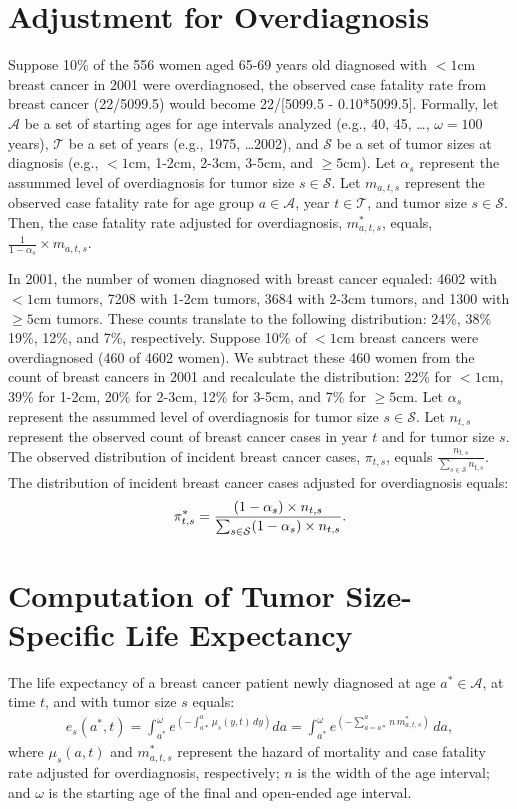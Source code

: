 \documentclass[11pt,letterpaper]{article}
\theoremstyle{plain}
\theoremstyle{remark}
\numberwithin{equation}{section}
\begin{document}
\section{Adjustment for Overdiagnosis}
Suppose 10\% of the 556 women aged 65-69 years old diagnosed with $<1$cm
breast cancer in 2001 were overdiagnosed, the observed case fatality
rate from breast cancer (22/5099.5) would become 22/[5099.5 -
0.10*5099.5].  Formally, let $\mathcal{A}$ be a set of starting ages
for age intervals analyzed (e.g., 40, 45, \dots, $\omega=100$ years), $\mathcal{T}$ be a set of
years (e.g., 1975, \dots 2002), and $\mathcal{S}$ be a set of tumor
sizes at diagnosis (e.g., $<1$cm, 1-2cm, 2-3cm, 3-5cm, and $\geq5$cm).
Let $\alpha_s$ represent the assummed level of overdiagnosis for tumor
size $s\in\mathcal{S}$.  Let $m_{a,t,s}$ represent the observed case
fatality rate for age group $a \in \mathcal{A}$, year $t \in
\mathcal{T}$, and tumor size $s \in \mathcal{S}$.  Then, the case
fatality rate adjusted for overdiagnosis, $m^*_{a,t,s}$, equals,
$\frac{1}{1-\alpha_s} \times m_{a,t,s}$.

In 2001, the number of women diagnosed with breast cancer equaled:
4602 with $<1$cm tumors, 7208 with 1-2cm tumors, 3684 with 2-3cm
tumors, and 1300 with $\geq5$cm tumors.  These counts translate to the
following distribution: 24\%, 38\% 19\%, 12\%, and 7\%, respectively.
Suppose 10\% of $<1$cm breast cancers were overdiagnosed (460 of 4602
women).  We subtract these 460 women from the count of breast cancers
in 2001 and recalculate the distribution: 22\% for $<1$cm, 39\% for
1-2cm, 20\% for 2-3cm, 12\% for 3-5cm, and 7\% for $\geq5$cm.  
Let $\alpha_s$ represent the assummed level of overdiagnosis for tumor
size $s\in\mathcal{S}$.  Let $n_{t,s}$ represent the observed count
of breast cancer cases in year $t$ and for tumor size $s$.  The
observed distribution of incident breast cancer cases, $\pi_{t,s}$, equals
$\frac{n_{t,s}}{\sum_{s\in\mathcal{S}}n_{t,s}}$.  The distribution of
incident breast cancer cases adjusted for overdiagnosis equals: 
\begin{eqnarray}
\pi^*_{t,s}=\frac{(1-\alpha_s) \times n_{t,s}}{\sum_{s\in\mathcal{S}}
  (1-\alpha_s) \times n_{t,s}} \notag.
\end{eqnarray} 

\section{Computation of Tumor Size-Specific Life Expectancy}
The life expectancy of a breast cancer patient newly diagnosed at age
$a^*\in\mathcal{A}$, at time $t$, and with tumor size $s$ equals:
\begin{eqnarray}
 e_s(a^*,t)=\int_{a^*}^{\omega} e^{\left( -\int_{a*}^{a}\mu_s(y,t)\,dy \right)}da =\int_{a^*}^{\omega} e^{\left(-\sum_{a=a*}^{a}n\,m^*_{a,t,s}\right)}\,da ,
\end{eqnarray} 
where $\mu_s(a,t)$ and $m^*_{a,t,s}$ represent the hazard of mortality
and case fatality rate adjusted for overdiagnosis, respectively; $n$
is the width of the age interval; and $\omega$ is the starting age of
the final and open-ended age interval.
\end{document}
